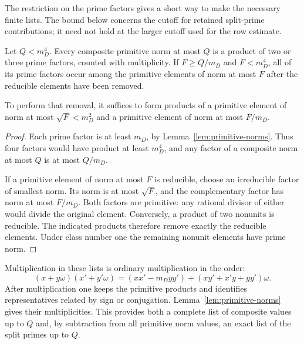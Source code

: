The restriction on the prime factors gives a short way to make the
necessary finite lists. The bound below concerns the cutoff for retained
split-prime contributions; it need not hold at the larger cutoff used
for the row estimate.
\begin{lemma}\label{lem:complete-factor-list}
Let $Q<m_D^4$. Every composite primitive norm at most $Q$ is a product
of two or three prime factors, counted with multiplicity. If
$F\geq Q/m_D$ and $F<m_D^4$, all of its prime factors occur among the
primitive elements of norm at most $F$ after the reducible elements
have been removed.

To perform that removal, it suffices to form products of a primitive
element of norm at most $\sqrt F<m_D^2$ and a primitive element of norm
at most $F/m_D$.
\end{lemma}
\begin{proof}
Each prime factor is at least $m_D$, by Lemma~\ref{lem:primitive-norms}.
Thus four factors would have product at least $m_D^4$, and any factor
of a composite norm at most $Q$ is at most $Q/m_D$.

If a primitive element of norm at most $F$ is reducible, choose an
irreducible factor of smallest norm. Its norm is at most $\sqrt F$,
and the complementary factor has norm at most $F/m_D$.
Both factors are primitive: any rational divisor of either would divide
the original element. Conversely, a product of two nonunits is reducible.
The indicated products therefore remove exactly the reducible elements.
Under class number one the remaining nonunit elements have prime norm.
\end{proof}

Multiplication in these lists is ordinary multiplication in the order:
\begin{equation}\label{eq:norm-product}
 (x+y\omega)(x'+y'\omega)
 =(xx'-m_Dyy')+(xy'+x'y+yy')\omega.
\end{equation}
After multiplication one keeps the primitive products and identifies
representatives related by sign or conjugation. Lemma~\ref{lem:primitive-norms}
gives their multiplicities. This provides both a complete list of composite
values up to $Q$ and, by subtraction from all primitive norm values, an
exact list of the split primes up to $Q$.

